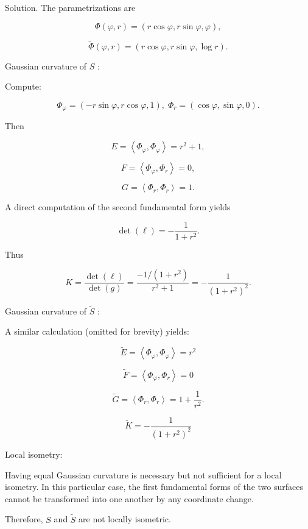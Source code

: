 \documentclass[10pt]{article}
\begin{document}
Solution. The parametrizations are

\[
\Phi \left( {\varphi ,r}\right)  = \left( {r\cos \varphi ,r\sin \varphi ,\varphi }\right) ,
\]

\[
\widetilde{\Phi }\left( {\varphi ,r}\right)  = \left( {r\cos \varphi ,r\sin \varphi ,\log r}\right) .
\]

Gaussian curvature of \(S\) :

Compute:

\[
{\Phi }_{\varphi } = \left( {-r\sin \varphi ,r\cos \varphi ,1}\right) ,\;{\Phi }_{r} = \left( {\cos \varphi ,\sin \varphi ,0}\right) .
\]

Then

\[
E = \left\langle  {{\Phi }_{\varphi },{\Phi }_{\varphi }}\right\rangle   = {r}^{2} + 1,
\]

\[
F = \left\langle  {{\Phi }_{\varphi },{\Phi }_{r}}\right\rangle   = 0,
\]

\[
G = \left\langle  {{\Phi }_{r},{\Phi }_{r}}\right\rangle   = 1.
\]

A direct computation of the second fundamental form yields

\[
\det \left( \ell \right)  =  - \frac{1}{1 + {r}^{2}}.
\]

Thus

\[
K = \frac{\det \left( \ell \right) }{\det \left( g\right) } = \frac{-1/\left( {1 + {r}^{2}}\right) }{{r}^{2} + 1} =  - \frac{1}{{\left( 1 + {r}^{2}\right) }^{2}}.
\]

Gaussian curvature of \(\widetilde{S}\) :

A similar calculation (omitted for brevity) yields:

\[
\widetilde{E} = \left\langle  {{\Phi }_{\varphi },{\Phi }_{\varphi }}\right\rangle   = {r}^{2}
\]

\[
\widetilde{F} = \left\langle  {{\Phi }_{\varphi },{\Phi }_{r}}\right\rangle   = 0
\]

\[
\widetilde{G} = \left\langle  {{\Phi }_{r},{\Phi }_{r}}\right\rangle   = 1 + \frac{1}{{r}^{2}}.
\]

\[
\widetilde{K} =  - \frac{1}{{\left( 1 + {r}^{2}\right) }^{2}}
\]

Local isometry:

Having equal Gaussian curvature is necessary but not sufficient for a local isometry. In this particular case, the first fundamental forms of the two surfaces cannot be transformed into one another by any coordinate change.

Therefore, \(S\) and \(\widetilde{S}\) are not locally isometric.
\end{document}
